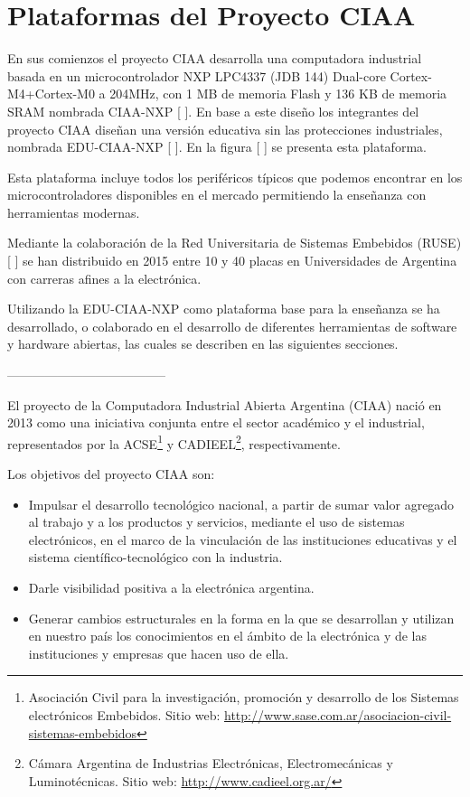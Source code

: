 \section{Plataformas del Proyecto CIAA}
\label{sec:ciaaBoards}



En sus comienzos el proyecto CIAA desarrolla una computadora industrial basada en un microcontrolador NXP LPC4337 (JDB 144) Dual-core Cortex-M4+Cortex-M0 a 204MHz, con 1 MB de memoria Flash y 136 KB de memoria SRAM nombrada CIAA-NXP [ ]. En base a este diseño los integrantes del proyecto CIAA diseñan una versión educativa sin las protecciones industriales, nombrada EDU-CIAA-NXP [ ]. En la figura [ ] se presenta esta plataforma.

Esta plataforma incluye todos los periféricos típicos que podemos encontrar en los microcontroladores disponibles en el mercado permitiendo la enseñanza con herramientas modernas.

Mediante la colaboración de la Red Universitaria de Sistemas Embebidos (RUSE) [ ] se han distribuido en 2015 entre 10 y 40 placas en Universidades de Argentina con carreras afines a la electrónica.

Utilizando la EDU-CIAA-NXP como plataforma base para la enseñanza se ha desarrollado, o colaborado en el desarrollo de diferentes herramientas de software y hardware abiertas, las cuales se describen en las siguientes secciones.

--------------------------------------


El proyecto de la Computadora Industrial Abierta Argentina (CIAA) nació en 2013 como una iniciativa conjunta entre el sector académico y el industrial, representados por la ACSE\footnote{Asociación Civil para la investigación, promoción y desarrollo de los Sistemas electrónicos Embebidos. Sitio web: \url{http://www.sase.com.ar/asociacion-civil-sistemas-embebidos}} y CADIEEL\footnote{Cámara Argentina de Industrias Electrónicas, Electromecánicas y Luminotécnicas. Sitio web: \url{http://www.cadieel.org.ar/}}, respectivamente.

\medskip

\noindent Los objetivos del proyecto CIAA son:

\begin{itemize}
\item
Impulsar el desarrollo tecnológico nacional, a partir de sumar valor agregado al trabajo y a los productos y servicios, mediante el uso de sistemas electrónicos, en el marco de la vinculación de las instituciones educativas y el sistema científico-tecnológico con la industria.
\item
Darle visibilidad positiva a la electrónica argentina.
\item
Generar cambios estructurales en la forma en la que se desarrollan y utilizan en nuestro país los conocimientos en el ámbito de la electrónica y de las instituciones y empresas que hacen uso de ella.
\end{itemize}

